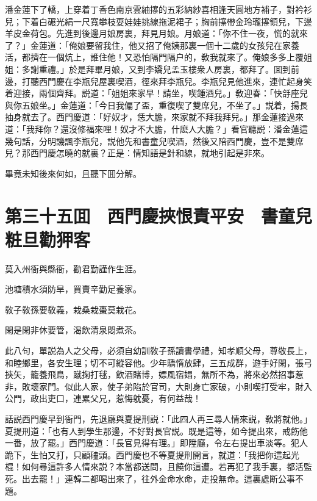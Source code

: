 潘金蓮下了轎，上穿着丁香色南京雲紬㩟的五彩納紗喜相逢天圓地方補子，對衿衫兒；下着白碾光絹一尺寬攀枝耍娃娃挑線拖泥裙子；胸前㩟帶金玲瓏㩟領兒，下邊羊皮金荷包。先進到後邊月娘房裏，拜見月娘。月娘道：「你不住一夜，慌的就來了？」金蓮道：「俺娘要留我住，他又招了俺姨那裏一個十二歲的女孩兒在家養活，都擠在一個炕上，誰住他！又恐怕隔門隔户的，敎我就來了。俺娘多多上覆姐姐：多謝重禮。」於是拜畢月娘，又到李嬌兒孟玉樓衆人房裏，都拜了。囬到前邊，打聽西門慶在李瓶兒屋裏喫酒，徑來拜李瓶兒。李瓶兒見他進來，連忙起身笑着迎接，兩個齊拜。説道：「姐姐來家早！請坐，喫鍾酒兒。」敎迎春：「快㧱座兒與你五娘坐。」金蓮道：「今日我偏了盃，重復喫了雙席兒，不坐了。」説着，揚長抽身就去了。西門慶道：「好奴才，恁大膽，來家就不拜我拜兒。」那金蓮接過來道：「我拜你？還沒修福來哩！奴才不大膽，什麽人大膽？」看官聽説：潘金蓮這幾句話，分明譏諷李瓶兒，説他先和書童兒喫酒，然後又陪西門慶，豈不是雙席兒？那西門慶怎曉的就裏？正是：情知語是針和線，就地引起是非來。

畢竟未知後來何如，且聽下囬分解。

\chapter*{第三十五囬　西門慶挾恨責平安　書童兒粧旦勸狎客}

莫入州衙與縣衙，勸君勤謹作生涯。

池塘積水須防旱，買賣辛勤足養家。

敎子敎孫要敎義，栽桑栽棗莫栽花。

閑是閑非休要管，渴飲清泉悶煮茶。

此八句，單説為人之父母，必須自幼訓敎子孫讀書學禮，知孝順父母，尊敬長上，和睦鄉里，各安生理；切不可縱容他。少年驕惰放肆，三五成群，遊手好閑，張弓挾矢，籠養飛鳥，蹴掬打毬，飲酒賭博，嫖風宿娼，無所不為，將來必然招事惹非，敗壞家門。似此人家，使子弟陷於官司，大則身亡家破，小則喫打受牢，財入公門，政出吏口，連累父兄，惹悔躭憂，有何益哉！

話説西門慶早到衙門，先退廳與夏提刑説：「此四人再三尋人情來説，敎將就他。」夏提刑道：「也有人到學生那邊，不好對長官説。既是這等，如今提出來，戒飭他一番，放了罷。」西門慶道：「長官見得有理。」即陞廳，令左右提出車淡等。犯人跪下，生怕又打，只顧磕頭。西門慶也不等夏提刑開言，就道：「我把你這起光棍！如何尋這許多人情來説？本當都送問，且饒你這遭。若再犯了我手裏，都活監死。出去罷！」連韓二都喝出來了，往外金命水命，走投無命。這裏處断公事不題。

